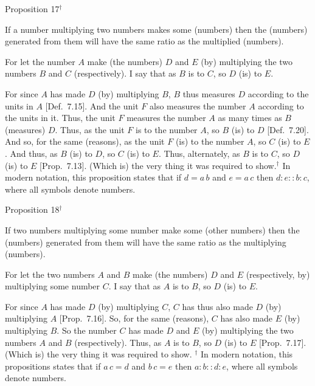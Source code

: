 
\begin{center}
{\large Proposition 17}$^\dag$
\end{center}

If a number  multiplying two numbers makes
some (numbers) then the (numbers) generated from them will have the
same ratio as the multiplied (numbers).

\epsfysize=0.9in
\centerline{}

For let the number $A$ make
(the numbers) $D$ and $E$ (by) multiplying the two numbers $B$ and $C$ (respectively). I say that as $B$ is to $C$, so $D$ (is) to $E$.

For since $A$  has made $D$ (by) multiplying $B$, $B$ thus measures $D$ according
to the units in $A$ [Def.~7.15]. And the unit $F$ also measures the number $A$
according to the units in it. Thus, the unit $F$ measures the number $A$ as many
times as $B$ (measures) $D$. Thus, as the unit $F$ is to the number $A$, 
so $B$ (is) to $D$ [Def.~7.20]. And so, for the same (reasons), as the unit $F$ (is) to the
number $A$,  so $C$ (is) to $E$. And thus, as $B$ (is) to $D$, so $C$ (is) to $E$. Thus,
alternately, as $B$ is to $C$, so $D$ (is) to $E$ [Prop.~7.13]. (Which is) the very thing it
was required to show.{\footnotesize\noindent$^\dag$ In modern notation, 
this proposition states that if $d = a\,b$ and $e=a\,c$ then
$d:e::b:c$, where all symbols denote numbers.}


\begin{center}
{\large Proposition 18}$^\dag$
\end{center}

If two numbers  multiplying some
number make some (other numbers) then the (numbers) generated from them
will have the same ratio as the multiplying (numbers).

\epsfysize=1.5in
\centerline{}

For let the two numbers $A$ and $B$ make (the numbers) $D$ and $E$ (respectively, by) multiplying
some number $C$. I say that as $A$ is to $B$, so $D$ (is) to $E$.

For since $A$ has made $D$ (by) multiplying $C$,  $C$ has thus also made $D$ (by)
multiplying $A$ [Prop.~7.16]. So, for
the same (reasons), $C$ has also made $E$ (by) multiplying $B$. So the
number $C$ has made  $D$ and $E$ (by) multiplying
the two numbers $A$ and $B$ (respectively). Thus, as $A$ is to $B$, so
$D$ (is) to $E$  [Prop.~7.17]. (Which is)
the very thing it was required to show.
{\footnotesize\noindent$^\dag$ In modern notation, this
propositions states that if $a\,c = d$ and $b\,c=e$ then $a:b::d:e$,
 where all symbols denote numbers.}
 
